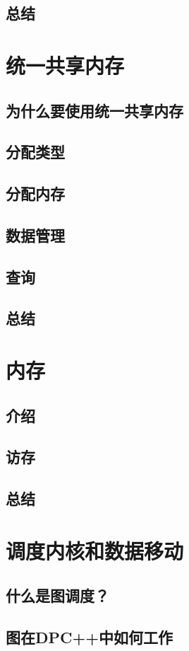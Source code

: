 \documentclass[11pt,a4paper,UTF8]{ctexart}
\begin{document}
		\subsection{总结}
	\section{统一共享内存}
		\subsection{为什么要使用统一共享内存}
		\subsection{分配类型}
		\subsection{分配内存}
		\subsection{数据管理}
		\subsection{查询}
		\subsection{总结}
	\section{内存}
		\subsection{介绍}
		\subsection{访存}
		\subsection{总结}
	\section{调度内核和数据移动}
		\subsection{什么是图调度？}
		\subsection{图在DPC++中如何工作}
\end{document}
